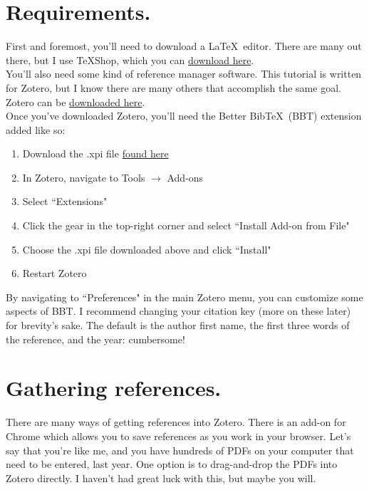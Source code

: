 \documentclass[11pt]{article}
\begin{document}
\section{Requirements.}

First and foremost, you'll need to download a \LaTeX \ editor. There are many out there, but I use \TeX Shop, which you can \href{https://pages.uoregon.edu/koch/texshop/obtaining.html}{download here}.\\

You'll also need some kind of reference manager software. This tutorial is written for Zotero, but I know there are many others that accomplish the same goal. Zotero can be \href{https://www.zotero.org/download/}{downloaded here}.\\

Once you've downloaded Zotero, you'll need the Better Bib\TeX\ (BBT) extension added like so:
\begin{enumerate}
\item{Download the .xpi file \href{https://github.com/retorquere/zotero-better-bibtex/releases/tag/v5.2.20}{found here}}
\item{In Zotero, navigate to Tools $\rightarrow$ Add-ons}
\item{Select ``Extensions"}
\item{Click the gear in the top-right corner and select ``Install Add-on from File"}
\item{Choose the .xpi file downloaded above and click ``Install"}
\item{Restart Zotero}
\end{enumerate}

By navigating to ``Preferences" in the main Zotero menu, you can customize some aspects of BBT. I recommend changing your citation key (more on these later) for brevity's sake.  The default is the author first name, the first three words of the reference, and the year: cumbersome!\\

\section{Gathering references.}

There are many ways of getting references into Zotero. There is an add-on for Chrome which allows you to save references as you work in your browser. Let's say that you're like me, and you have hundreds of PDFs on your computer that need to be entered, last year. One option is to drag-and-drop the PDFs into Zotero directly. I haven't had great luck with this, but maybe you will.
\end{document}
